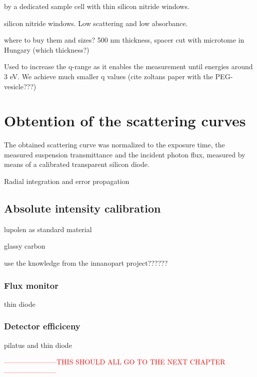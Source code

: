 by a dedicated sample cell with thin silicon nitride windows. 

silicon nitride windows. Low scattering and low absorbance. 

where to buy them and sizes? 500 nm thickness, spacer cut with microtome in Hungary (which thickness?)

Used to increase the q-range as it enables the measurement until energies around 3 eV. We achieve much smaller q values (cite zoltans paper with the PEG-vesicle???)

\section{Obtention of the scattering curves}

The obtained scattering curve was normalized to the exposure time, the measured suspension transmittance and the incident photon flux, measured by means of a calibrated transparent silicon diode. 

Radial integration and error propagation

\subsection{Absolute intensity calibration}

lupolen as standard material \cite{kratky_absolute_1966,shaffer_calibration_1974}

glassy carbon \cite{perret_glassy_1972}

use the knowledge from the innanopart project??????
\subsubsection{Flux monitor}
thin diode
\subsubsection{Detector efficiceny}
pilatus and thin diode





















\textcolor{red}{-----------------------THIS SHOULD ALL GO TO THE NEXT CHAPTER-----------------------}











